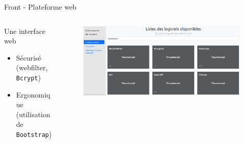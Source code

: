 \documentclass{cubeamer}
\begin{document}
\begin{frame}{Front - Plateforme web}
    \begin{columns}

        \begin{column}{.25\textwidth}
            Une interface web            
            \begin{itemize}
                \item Sécurisé \\{\scriptsize{(webfilter, \verb:Bcrypt:)}} 
                \item Ergonomique {\scriptsize({utilisation de \verb:Bootstrap:)}}
            \end{itemize}
        \end{column}

        \begin{column}{.75\textwidth}
            \begin{figure}
                \includegraphics[scale=0.27]{img/web1.png}
            \end{figure}  
        \end{column} 

    \end{columns}

\end{frame}
\end{document}
